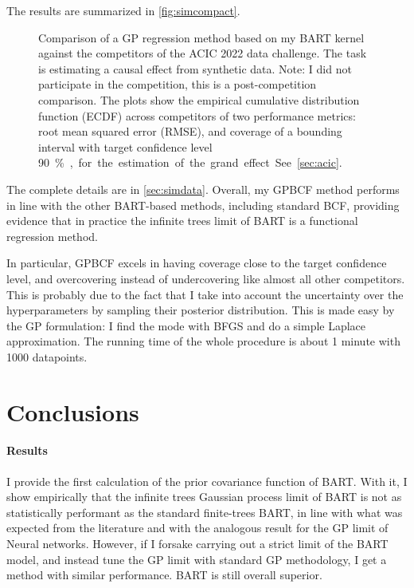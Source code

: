 \documentclass[a4paper]{article}
\theoremstyle{definition}
\newcommand{\widecenter}[1]{\noindent\hspace{-\textwidth}\makebox[3\textwidth][c]{#1}}
\newcommand{\includempl}[1]{\texttt{[image: \#1]}}
\let\oldmarginpar\marginpar
\renewcommand{\marginpar}[1]{\oldmarginpar{\sffamily\scriptsize #1}}
\renewcommand{\marginpar}[1]{\relax} %
\begin{document}
    The results are summarized in \autoref{fig:simcompact}.
    \begin{figure}
        \widecenter{\includempl{analysis_compact}}
        \caption{\label{fig:simcompact} Comparison of a GP regression method based on my BART kernel against the competitors of the ACIC 2022 data challenge. The task is estimating a causal effect from synthetic data. Note: I did not participate in the competition, this is a post-competition comparison. The plots show the empirical cumulative distribution function (ECDF) across competitors of two performance metrics: root mean squared error (RMSE), and coverage of a bounding interval with target confidence level \SI{90}\%, for the estimation of the grand effect. See \autoref{sec:acic}.}
    \end{figure}
    The complete details are in \autoref{sec:simdata}. Overall, my GPBCF method performs in line with the other BART-based methods, including standard BCF\marginpar{I should really run a standard BCF together, to be sure I have the same feature engineering. The BCF in the competition may be poorly set up.}, providing evidence that in practice the infinite trees limit of BART is a functional regression method.

    In particular, GPBCF excels in having coverage close to the target confidence level, and overcovering instead of undercovering like almost all other competitors. This is probably due to the fact that I take into account the uncertainty over the hyperparameters by sampling their posterior distribution.\marginpar{I could actually investigate this by not sampling the hypers after having optimized them, instead of hypothesize.} This is made easy by the GP formulation: I find the mode with BFGS and do a simple Laplace approximation. The running time of the whole procedure is about 1 minute with 1000 datapoints.

    \section{Conclusions}

    \paragraph{Results}

    I provide the first calculation of the prior covariance function of BART. With it, I show empirically that the infinite trees Gaussian process limit of BART is not as statistically performant as the standard finite-trees BART, in line with what was expected from the literature and with the analogous result for the GP limit of Neural networks. However, if I forsake carrying out a strict limit of the BART model, and instead tune the GP limit with standard GP methodology, I get a method with similar performance. BART is still overall superior.
\end{document}

